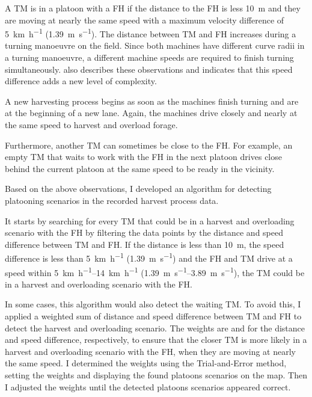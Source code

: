 A \ac{TM} is in a platoon with a \ac{FH} if the distance to the \ac{FH} is less \SI{10}{\metre} and they are moving at
nearly the same speed with a maximum
velocity difference of \SI{5}{\km\per\hour} (\SI{1.39}{\metre\per\second}).
The distance between \ac{TM} and \ac{FH} increases during a turning manoeuvre on the field.
Since both machines have different curve radii in a turning manoeuvre, a different machine speeds are required to
finish turning simultaneously.
\textcite{smolnik_5g_2020} also describes these observations and indicates that this speed difference adds a new
level of complexity.

A new harvesting process begins as soon as the machines finish turning and are at the beginning of a new lane.
Again, the machines drive closely and nearly at the same speed to harvest and overload forage.

Furthermore, another \ac{TM} can sometimes be close to the \ac{FH}.
For example, an empty \ac{TM} that waits to work with the \ac{FH} in the next platoon drives close behind the current
platoon at the same speed to be ready in the vicinity.

Based on the above observations, I developed an algorithm for detecting platooning scenarios in the recorded harvest process data.

It starts by searching for every \ac{TM} that could be in a harvest and overloading scenario with the \ac{FH} by filtering
the data points by the distance and speed difference between \ac{TM} and \ac{FH}.
If the distance is less than \SI{10}{\metre}, the speed difference is less than \SI{5}{\km\per\hour}
(\SI{1.39}{\metre\per\second}) and the \ac{FH} and \ac{TM} drive at a speed within \SIrange{5}{14}{\km\per\hour}
(\SIrange{1.39}{3.89}{\metre\per\second}), the \ac{TM} could be in a harvest and overloading scenario with the \ac{FH}.

In some cases, this algorithm would also detect the waiting \ac{TM}.
To avoid this, I applied a weighted sum of distance and speed difference
between \ac{TM} and \ac{FH} to detect the harvest and overloading scenario.
The weights are  and  for the distance and speed difference, respectively, to ensure that
the closer \ac{TM} is more likely in a harvest and overloading scenario with the \ac{FH}, when they are moving at nearly the same speed.
I determined the weights using the Trial-and-Error method, setting the weights and displaying
the found platoons scenarios on the map.
Then I adjusted the weights until the detected platoons scenarios appeared correct.

